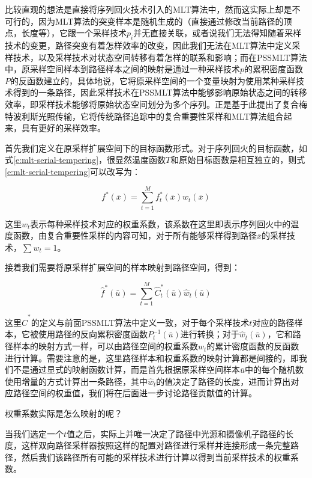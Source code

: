 比较直观的想法是直接将序列回火技术引入的MLT算法中，然而这实际上却是不可行的，因为MLT算法的突变样本是随机生成的（直接通过修改当前路径的顶点，长度等），它跟一个采样技术$p_i$并无直接关联，或者说我们无法得知随着采样技术的变更，路径突变有着怎样效率的改变，因此我们无法在MLT算法中定义采样技术，以及采样技术对状态空间转移有着怎样的联系和影响；而在PSSMLT算法中，原采样空间样本到路径样本之间的映射是通过一种采样技术$p$的累积密度函数$P$的反函数建立的，具体地说，它将原采样空间的一个变量映射为使用某种采样技术得到的一条路径，因此采样技术在PSSMLT算法中能够影响原始状态之间的转移效率，即采样技术能够将原始状态空间划分为多个序列。\cite{a:MultiplexedMetropolisLightTransport}正是基于此提出了复合梅特波利斯光照传输，它将传统路径追踪中的复合重要性采样和MLT算法组合起来，具有更好的采样效率。

首先我们定义在原采样扩展空间下的目标函数形式。对于序列回火的目标函数，如式\ref{e:mlt-serial-tempering}，很显然温度函数$T$和原始目标函数是相互独立的，则式\ref{e:mlt-serial-tempering}可以改写为：

\begin{equation}\label{e:mlt-pssmlt-tempering}
	f^{*}(\bar{x})=\sum^{M}_{t=1}f^{*}_t(\bar{x})w_t(\bar{x})
\end{equation}

\noindent 这里$w_t$表示每种采样技术对应的权重系数，该系数在这里即表示序列回火中的温度函数，由复合重要性采样的内容可知，对于所有能够采样得到路径$\bar{x}$的采样技术，$\sum w_t=1$。

接着我们需要将原采样扩展空间的样本映射到路径空间，得到：

\begin{equation}
	\hat{f}^{*}(\bar{u})=\sum^{M}_{t=1}\hat{C}^{*}_t(\bar{u})\hat{w}_t(\bar{u})
\end{equation}

\noindent 这里$\hat{C}^{*}$的定义与前面PSSMLT算法中定义一致，对于每个采样技术$t$对应的路径样本，它被使用路径的反向累积密度函数$P^{-1}_t(\bar{u})$进行转换；对于$\hat{w}_t(\bar{u})$，它和路径样本的映射方式一样，可以由路径空间的权重系数$w_t$的累计密度函数的反函数进行计算。需要注意的是，这里路径样本和权重系数的映射计算都是间接的，即我们不是通过显式的映射函数计算，而是首先根据原采样空间样本$\bar{u}$中的每个随机数使用增量的方式计算出一条路径，其中$\hat{w}_t$的值决定了路径的长度，进而计算出对应路径空间的权重值，我们将在后面进一步讨论路径贡献值的计算。

\begin{myshaded}
	权重系数实际是怎么映射的呢？
	
	当我们选定一个$t$值之后，实际上并唯一决定了路径中光源和摄像机子路径的长度，这样双向路径采样器按照这样的配置对路径进行采样并连接形成一条完整路径，然后我们该路径所有可能的采样技术进行计算以得到当前采样技术的权重系数。
\end{myshaded}


